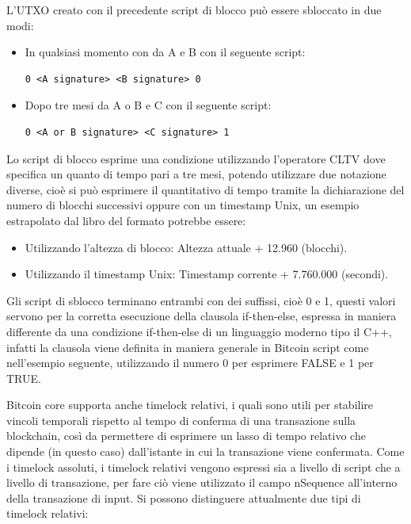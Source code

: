 

L’UTXO creato con il precedente script di blocco può essere sbloccato in due modi:
\begin{itemize}
  \item In qualsiasi momento con da A e B con il seguente script:
  \begin{lstlisting}[language=bitcoinscript]
   0 <A signature> <B signature> 0
  \end{lstlisting}
  \item Dopo tre mesi da A o B e C con il seguente script:
  \begin{lstlisting}[language=bitcoinscript]
   0 <A or B signature> <C signature> 1
  \end{lstlisting}
\end{itemize}

Lo script di blocco esprime una condizione utilizzando l’operatore CLTV dove specifica un quanto di tempo pari a tre mesi, potendo utilizzare due notazione diverse, cioè si può esprimere il quantitativo di tempo tramite la dichiarazione del numero di blocchi successivi oppure con un timestamp Unix, un esempio estrapolato dal libro \cite{bitcoinbook} del formato potrebbe essere:
\begin{itemize}
  \item Utilizzando l’altezza di blocco: Altezza attuale +  12.960 (blocchi).
  \item Utilizzando il timestamp Unix: Timestamp corrente + 7.760.000 (secondi).
\end{itemize}

Gli script di sblocco terminano entrambi con dei suffissi, cioè 0 e 1, questi valori servono per la corretta esecuzione della clausola if-then-else, espressa in maniera differente da una condizione if-then-else di un linguaggio moderno tipo il C++, infatti la clausola viene definita in maniera generale in Bitcoin script come nell’esempio seguente, utilizzando il numero 0 per esprimere FALSE e 1 per TRUE.



Bitcoin core supporta anche timelock relativi, i quali sono utili per stabilire vincoli temporali rispetto al tempo di conferma di una transazione sulla blockchain, così da permettere di esprimere un lasso di tempo relativo che dipende (in questo caso) dall’istante in cui la transazione viene confermata.
Come i timelock assoluti, i timelock relativi vengono espressi sia a livello di script che a livello di transazione, per fare ciò viene utilizzato il campo nSequence all’interno della transazione di input.
Si possono distinguere attualmente due tipi di timelock relativi:

